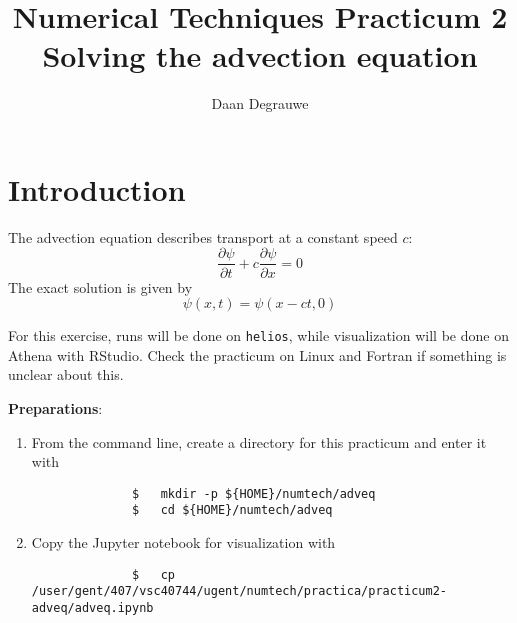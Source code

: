 \documentclass[a4paper]{article}
\title{%
	\bfseries%
	{\large Numerical Techniques Practicum 2}\\[3ex]
	{\Large Solving the advection equation}
}
\author{Daan Degrauwe}
\begin{document}
%
\maketitle
%
\section{Introduction}
%
\par
The advection equation describes transport at a constant speed $c$:
%
\begin{equation}
	\frac{\partial \psi}{\partial t}+c\frac{\partial \psi}{\partial x}=0
\end{equation}
%
The exact solution is given by
%
\begin{equation}
	\psi(x,t)=\psi(x-ct,0)
\end{equation}
%
\par
For this exercise, runs will be done on \verb+helios+, while visualization will be done on Athena with RStudio. Check the practicum on Linux and Fortran if something is unclear about this.
%
\par\vspace*{3ex}
\textbf{Preparations}:
%
\begin{enumerate}
	\item From the command line, create a directory for this practicum and enter it with
		\begin{verbatim}
			  $   mkdir -p ${HOME}/numtech/adveq
			  $   cd ${HOME}/numtech/adveq
		\end{verbatim}
	\item Copy the Jupyter notebook for visualization with
		\begin{verbatim}
			  $   cp /user/gent/407/vsc40744/ugent/numtech/practica/practicum2-adveq/adveq.ipynb 
		\end{verbatim}
\end{enumerate}
%
\end{document}
